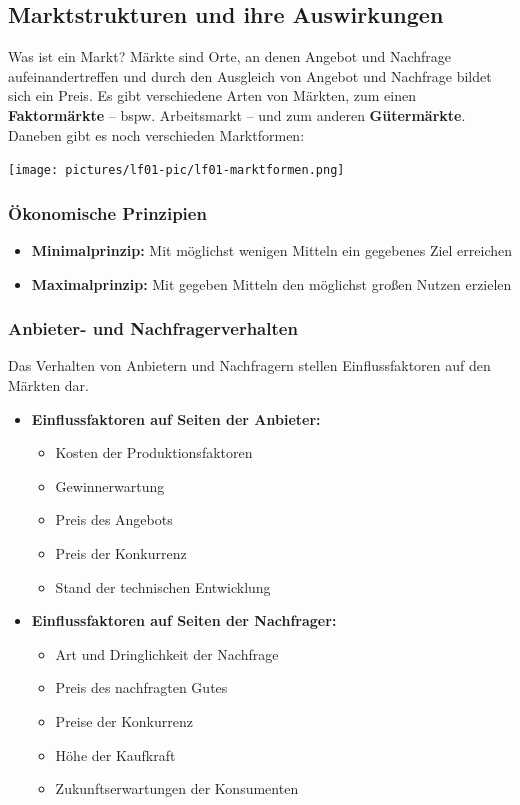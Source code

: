 
\subsection{Marktstrukturen und ihre Auswirkungen}

Was ist ein Markt? Märkte sind Orte, an denen Angebot und Nachfrage aufeinandertreffen und durch den Ausgleich von Angebot und Nachfrage bildet sich ein Preis. Es gibt verschiedene Arten von Märkten, zum einen {\bf Faktormärkte} -- bspw. Arbeitsmarkt -- und zum anderen {\bf Gütermärkte}. Daneben gibt es noch verschieden Marktformen:

\texttt{[image: pictures/lf01-pic/lf01-marktformen.png]}

\subsubsection{Ökonomische Prinzipien}

\begin{itemize}
\setlength\itemsep{0em}
	\item \textbf{Minimalprinzip:} Mit möglichst wenigen Mitteln ein gegebenes Ziel erreichen
	\item \textbf{Maximalprinzip:} Mit gegeben Mitteln den möglichst großen Nutzen erzielen
\end{itemize}

\subsubsection{Anbieter- und Nachfragerverhalten}
Das Verhalten von Anbietern und Nachfragern stellen Einflussfaktoren auf den Märkten dar.

\begin{itemize}
	\setlength\itemsep{0em}
	\item {\bf Einflussfaktoren auf Seiten der Anbieter:}
	\begin{itemize}
	\setlength\itemsep{0em}
		\item Kosten der Produktionsfaktoren
		\item Gewinnerwartung
		\item Preis des Angebots
		\item Preis der Konkurrenz
		\item Stand der technischen Entwicklung
	\end{itemize}
	\item {\bf Einflussfaktoren auf Seiten der Nachfrager:}
	\begin{itemize}
	\setlength\itemsep{0em}
		\item Art und Dringlichkeit der Nachfrage
		\item Preis des nachfragten Gutes
		\item Preise der Konkurrenz
		\item Höhe der Kaufkraft
		\item Zukunftserwartungen der Konsumenten
	\end{itemize}
\end{itemize}


